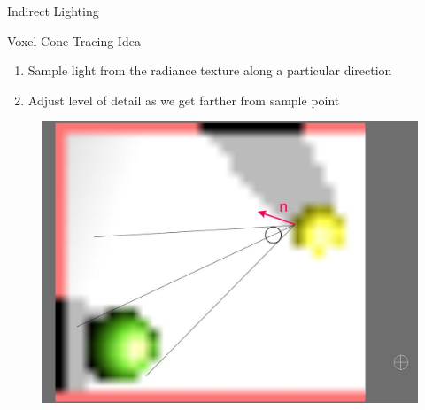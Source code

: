 \documentclass[10pt]{beamer}
\begin{document}
\begin{frame}{Indirect Lighting}
      \begin{block}{Voxel Cone Tracing Idea}
        \begin{enumerate}
          \item Sample light from the radiance texture along a particular direction
          \item Adjust level of detail as we get farther from sample point
        \end{enumerate}
      \end{block}

      \begin{figure}
        \includegraphics[height=0.5\textheight]{conetrace2}
      \end{figure}
\end{frame}
\end{document}
